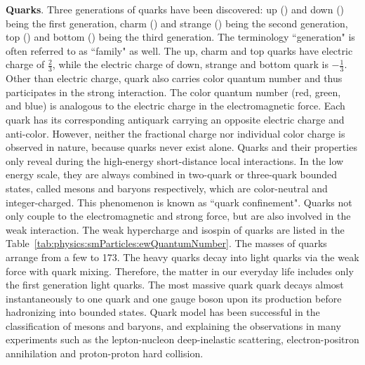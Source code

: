 \textbf{Quarks}. Three generations of quarks have been discovered: up (\PQu) and down (\PQd) being the first generation, charm (\PQc) and strange (\PQs) being the second generation, top (\PQt) and bottom (\PQb) being the third generation. The terminology ``generation" is often referred to as ``family" as well. The up, charm and top quarks have electric charge of $\frac{2}{3}$, while the electric charge of down, strange and bottom quark is $-\frac{1}{3}$. Other than electric charge, quark also carries color quantum number and thus participates in the strong interaction. The color quantum number (red, green, and blue) is analogous to the electric charge in the electromagnetic force. Each quark has its corresponding antiquark carrying an opposite electric charge and anti-color. However, neither the fractional charge nor individual color charge is observed in nature, because quarks never exist alone. Quarks and their properties only reveal during the high-energy short-distance local interactions. In the low energy scale, they are always combined in two-quark or three-quark bounded states, called mesons and baryons respectively, which are color-neutral and integer-charged. This phenomenon is known as ``quark confinement". Quarks not only couple to the electromagnetic and strong force, but are also involved in the weak interaction. The weak hypercharge and isospin of quarks are listed in the Table~\ref{tab:physics:smParticles:ewQuantumNumber}. The masses of quarks arrange from a few \MeV to 173\GeV. The heavy quarks decay into light quarks via the weak force with quark mixing. Therefore, the matter in our everyday life includes only the first generation light quarks. The most massive quark \PQt quark decays almost instantaneously to one \PQb quark and one \PW gauge boson upon its production before hadronizing into bounded states. Quark model has been successful in the classification of mesons and baryons, and explaining the observations in many experiments such as the lepton-nucleon deep-inelastic scattering, electron-positron annihilation and proton-proton hard collision.



